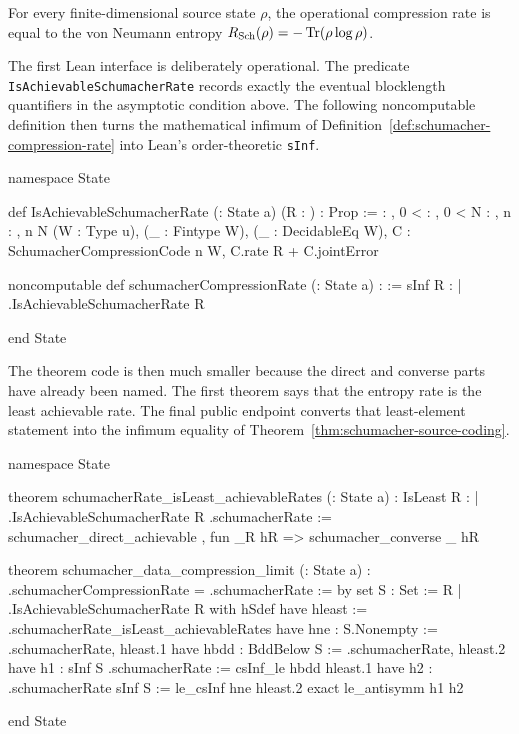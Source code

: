 \documentclass[10pt,a4paper]{article}
\newif\ifqitLineFocused
\newcommand{\qitHighlightSpan}[2]{%
	\ifnum\value{lstnumber}<#1\relax
	\else
		\ifnum\value{lstnumber}>#2\relax
		\else
			\qitLineFocusedtrue
		\fi
	\fi
}
\begin{document}
\begin{theorem}
    \label{thm:schumacher-source-coding}
    For every finite-dimensional source state $\rho$, the operational
    compression rate is equal to the von Neumann entropy $R_{\mathrm{Sch}}(\rho)=-\operatorname{Tr}(\rho\log\rho)$.
\end{theorem}

The first Lean interface is deliberately operational.  The predicate
\texttt{IsAchievableSchumacher\allowbreak Rate} records exactly the eventual
blocklength quantifiers in the asymptotic condition above.  The following
noncomputable definition then turns the mathematical infimum of
Definition~\ref{def:schumacher-compression-rate} into Lean's
order-theoretic \texttt{sInf}.
	
\begin{qitleancode}[title={Operational Schumacher rate},
qit focus={\qitHighlightSpan{4}{8}\qitHighlightSpan{10}{11}}]
namespace State

def IsAchievableSchumacherRate (\rho : State a) (R : \mathbbR) : Prop :=
  \forall \delta : \mathbbR, 0 < \delta \to \forall \epsilon : \mathbbR, 0 < \epsilon \to
    \exists N : \mathbbN, \forall n : \mathbbN, n \ge N \to
      \exists (W : Type u), \exists (_ : Fintype W), \exists (_ : DecidableEq W),
        \exists C : SchumacherCompressionCode \rho n W,
          C.rate \le R + \delta \wedge C.jointError \le \epsilon

noncomputable def schumacherCompressionRate (\rho : State a) : \mathbbR :=
  sInf {R : \mathbbR | \rho.IsAchievableSchumacherRate R}

end State
\end{qitleancode}
	
The theorem code is then much smaller because the direct and converse parts
have already been named.  The first theorem says that the entropy rate is the
least achievable rate. The final public endpoint converts that least-element
statement into the infimum equality of
Theorem~\ref{thm:schumacher-source-coding}.
	
\begin{qitleancode}[title={Schumacher compression endpoint},
qit focus={\qitHighlightSpan{3}{6}\qitHighlightSpan{8}{9}}]
namespace State

theorem schumacherRate_isLeast_achievableRates (\rho : State a) :
    IsLeast {R : \mathbbR | \rho.IsAchievableSchumacherRate R} \rho.schumacherRate :=
  \langle schumacher_direct_achievable \rho,
    fun _R hR => schumacher_converse \rho _ hR\rangle

theorem schumacher_data_compression_limit (\rho : State a) :
    \rho.schumacherCompressionRate = \rho.schumacherRate := by
  set S : Set \mathbbR := {R | \rho.IsAchievableSchumacherRate R} with hSdef
  have hleast := \rho.schumacherRate_isLeast_achievableRates
  have hne : S.Nonempty := \langle \rho.schumacherRate, hleast.1\rangle
  have hbdd : BddBelow S := \langle \rho.schumacherRate, hleast.2\rangle
  have h1 : sInf S \le \rho.schumacherRate := csInf_le hbdd hleast.1
  have h2 : \rho.schumacherRate \le sInf S := le_csInf hne hleast.2
  exact le_antisymm h1 h2

end State
\end{qitleancode}
	
\end{document}
